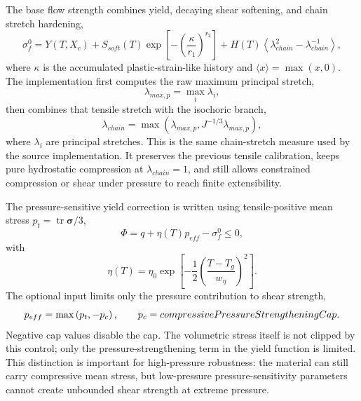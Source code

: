 The base flow strength combines yield, decaying shear softening, and chain stretch hardening,
\begin{equation}
  \sigma_f^0 =
  Y(T,X_c)
  + S_{soft}(T)\exp\left[-\left(\frac{\kappa}{r_1}\right)^{r_2}\right]
  + H(T)\left\langle \lambda_{chain}^{2}-\lambda_{chain}^{-1}\right\rangle,
  \label{eq:surface-polymer-base-flow}
\end{equation}
where \(\kappa\) is the accumulated plastic-strain-like history and \(\langle x\rangle=\max(x,0)\).  The implementation first computes the raw maximum principal stretch,
\begin{equation}
  \lambda_{max,p}=\max_i \lambda_i,
\end{equation}
then combines that tensile stretch with the isochoric branch,
\begin{equation}
  \lambda_{chain}=\max\left(\lambda_{max,p}, J^{-1/3}\lambda_{max,p}\right),
  \label{eq:surface-polymer-chain-stretch}
\end{equation}
where \(\lambda_i\) are principal stretches.  This is the same chain-stretch measure used by the source implementation.  It preserves the previous tensile calibration, keeps pure hydrostatic compression at \(\lambda_{chain}=1\), and still allows constrained compression or shear under pressure to reach finite extensibility.

The pressure-sensitive yield correction is written using tensile-positive mean stress \(p_t=\operatorname{tr}\boldsymbol{\sigma}/3\),
\begin{equation}
  \Phi=q+\eta(T)p_{eff}-\sigma_f^0\le 0,
  \label{eq:surface-polymer-yield}
\end{equation}
with
\begin{equation}
  \eta(T)=\eta_0\exp\left[-\frac{1}{2}\left(\frac{T-T_g}{w_{\eta}}\right)^2\right].
  \label{eq:surface-polymer-pressure-asymmetry}
\end{equation}
The optional input  limits only the pressure contribution to shear strength,
\begin{equation}
  p_{eff}=\max\left(p_t,-p_c\right),
  \qquad
  p_c=compressivePressureStrengtheningCap.
  \label{eq:surface-polymer-pressure-cap}
\end{equation}
Negative cap values disable the cap.  The volumetric stress itself is not clipped by this control; only the pressure-strengthening term in the yield function is limited.  This distinction is important for high-pressure robustness: the material can still carry compressive mean stress, but low-pressure pressure-sensitivity parameters cannot create unbounded shear strength at extreme pressure.


